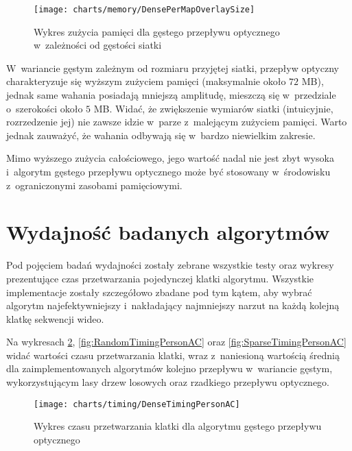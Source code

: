       \begin{figure}[!ht]
        \centering
        \texttt{[image: charts/memory/DensePerMapOverlaySize]}
        \caption[Wykres zużycia pamięci dla gęstego przepływu optycznego w~zależności od gęstości siatki]
                {Wykres zużycia pamięci dla gęstego przepływu optycznego w~zależności od gęstości siatki}
        \label{fig:DenseOpticalFlowPerMapSize}
      \end{figure}

    \newpage

    W~wariancie gęstym zależnym od rozmiaru przyjętej siatki, przepływ optyczny charakteryzuje się wyższym zużyciem pamięci (maksymalnie około $72$ MB), jednak same wahania posiadają mniejszą amplitudę, mieszczą się w~przedziale o~szerokości około $5$ MB. Widać, że zwiększenie wymiarów siatki (intuicyjnie, rozrzedzenie jej) nie zawsze idzie w~parze z~malejącym zużyciem pamięci. Warto jednak zauważyć, że wahania odbywają się w~bardzo niewielkim zakresie.

    Mimo wyższego zużycia całościowego, jego wartość nadal nie jest zbyt wysoka i~algorytm gęstego przepływu optycznego może być stosowany w~środowisku z~ograniczonymi zasobami pamięciowymi.

  \section{Wydajność badanych algorytmów}\label{Section_Timing}

    Pod pojęciem badań wydajności zostały zebrane wszystkie testy oraz wykresy prezentujące czas przetwarzania pojedynczej klatki algorytmu. Wszystkie implementacje zostały szczegółowo zbadane pod tym kątem, aby wybrać algorytm najefektywniejszy i~nakładający najmniejszy narzut na każdą kolejną klatkę sekwencji wideo.

    Na wykresach \ref{fig:DenseTimingPersonAC}, \ref{fig:RandomTimingPersonAC} oraz \ref{fig:SparseTimingPersonAC} widać wartości czasu przetwarzania klatki, wraz z~naniesioną wartością średnią dla zaimplementowanych algorytmów kolejno przepływu w~wariancie gęstym, wykorzystującym lasy drzew losowych oraz rzadkiego przepływu optycznego.

      \begin{figure}[!ht]
        \centering
        \texttt{[image: charts/timing/DenseTimingPersonAC]}
        \caption[Wykres czasu przetwarzania klatki dla algorytmu gęstego przepływu optycznego]
                {Wykres czasu przetwarzania klatki dla algorytmu gęstego przepływu optycznego}
        \label{fig:DenseTimingPersonAC}
      \end{figure}

